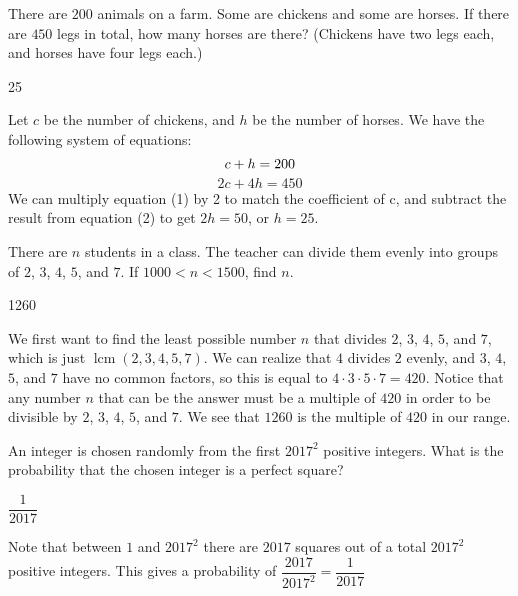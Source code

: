 \documentclass[11pt]{article}
\begin{document}
\setlength{\parindent}{0pt}

\begin{problem}
There are $200$ animals on a farm. Some are chickens and some are horses. If there are $450$ legs in total, how many horses are there?
(Chickens have two legs each, and horses have four legs each.)
\end{problem}

\begin{answer}
25
\end{answer}

\begin{solution}
Let $c$ be the number of chickens, and $h$ be the number of horses. We have the following system of equations:
\begin{equation}
c+h = 200 \\
\end{equation}
\begin{equation}
2c + 4h = 450
\end{equation}
We can multiply equation (1) by 2 to match the coefficient of c, and subtract the result from equation (2) to get $2h = 50$, or $h = \boxed{25}$.
\end{solution}


\begin{problem}
There are $n$ students in a class. The teacher can divide them evenly into groups of $2$, $3$, $4$, $5$, and $7$. If $1000 < n < 1500$, find $n$.
\end{problem}

\begin{answer}
1260
\end{answer}

\begin{solution}
We first want to find the least possible number $n$ that divides $2$, $3$, $4$, $5$, and $7$, which is just $\operatorname{lcm}(2, 3, 4, 5, 7)$. 
We can realize that $4$ divides $2$ evenly, and $3$, $4$, $5$, and $7$ have no common factors, 
so this is equal to $4 \cdot 3 \cdot 5 \cdot 7 = 420$. Notice that any number $n$ that can be the answer must be a multiple of 
$420$ in order to be divisible by $2$, $3$, $4$, $5$, and $7$. We see that $\boxed{1260}$ is the multiple of $420$ in our range. 
\end{solution}


\begin{problem}
An integer is chosen randomly from the first $2017^2$ positive integers. What is the probability that the chosen integer is a perfect square?
\end{problem}
\begin{answer}
$\dfrac{1}{2017}$
\end{answer}
\begin{solution}
Note that between $1$ and $2017^2$ there are $2017$ squares out of a total $2017^2$ positive integers. This gives a probability of $\dfrac{2017}{2017^2} = \boxed{\dfrac{1}{2017}}$
\end{solution}
\end{document}

